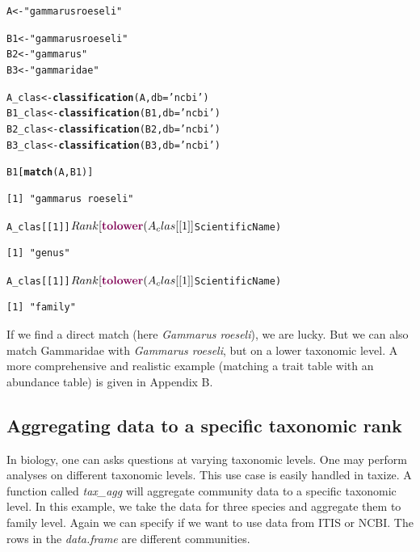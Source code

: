 \documentclass[10pt,a4paper,twocolumn]{article}
\makeatletter
\newcommand{\hlfunctioncall}[1]{\textcolor[rgb]{0.501960784313725,0,0.329411764705882}{\textbf{#1}}}%
\newcommand{\hlstring}[1]{\textcolor[rgb]{0.6,0.6,1}{#1}}%
\newenvironment{kframe}{%
 \def\at@end@of@kframe{}%
 \ifinner\ifhmode%
  \def\at@end@of@kframe{\end{minipage}}%
  \begin{minipage}{\columnwidth}%
 \fi\fi%
 \def\FrameCommand##1{\hskip\@totalleftmargin \hskip-\fboxsep
 \colorbox{shadecolor}{##1}\hskip-\fboxsep
     \hskip-\linewidth \hskip-\@totalleftmargin \hskip\columnwidth}%
 \MakeFramed {\advance\hsize-\width
   \@totalleftmargin\z@ \linewidth\hsize
   \@setminipage}}%
 {\par\unskip\endMakeFramed%
 \at@end@of@kframe}
\newenvironment{knitrout}{}{} %
\makeatother
\begin{document}
\begin{knitrout}
\begin{scriptsize}
\color{fgcolor}\begin{kframe}
\begin{alltt}
A <- \hlstring{"gammarus roeseli"} 

B1 <- \hlstring{"gammarus roeseli"}
B2 <- \hlstring{"gammarus"}
B3 <- \hlstring{"gammaridae"}

A_clas <- \hlfunctioncall{classification}(A, db = \hlstring{'ncbi'})
B1_clas <- \hlfunctioncall{classification}(B1, db = \hlstring{'ncbi'})
B2_clas <- \hlfunctioncall{classification}(B2, db = \hlstring{'ncbi'})
B3_clas <- \hlfunctioncall{classification}(B3, db = \hlstring{'ncbi'})


B1[\hlfunctioncall{match}(A, B1)]
\end{alltt}
\begin{verbatim}
[1] "gammarus roeseli"
\end{verbatim}
\begin{alltt}
A_clas[[1]]$Rank[\hlfunctioncall{tolower}(A_clas[[1]]$ScientificName) %
\end{alltt}
\begin{verbatim}
[1] "genus"
\end{verbatim}
\begin{alltt}
A_clas[[1]]$Rank[\hlfunctioncall{tolower}(A_clas[[1]]$ScientificName) %
\end{alltt}
\begin{verbatim}
[1] "family"
\end{verbatim}
\end{kframe}
\end{scriptsize}
\end{knitrout}


If we find a direct match (here \emph{Gammarus roeseli}), we are lucky. But we can also match Gammaridae with \emph{Gammarus roeseli}, but on a lower taxonomic level. A more comprehensive and realistic example (matching a trait table with an abundance table) is given in Appendix B.


\subsection*{Aggregating data to a specific taxonomic rank}

In biology, one can asks questions at varying taxonomic levels. One may perform analyses on different taxonomic levels. This use case is easily handled in taxize. A function called \emph{tax\_agg} will aggregate community data to a specific taxonomic level. In this example, we take the data for three species and aggregate them to family level. Again we can specify if we want to use data from ITIS or NCBI. The rows in the \emph{data.frame} are different communities.
\end{document}
